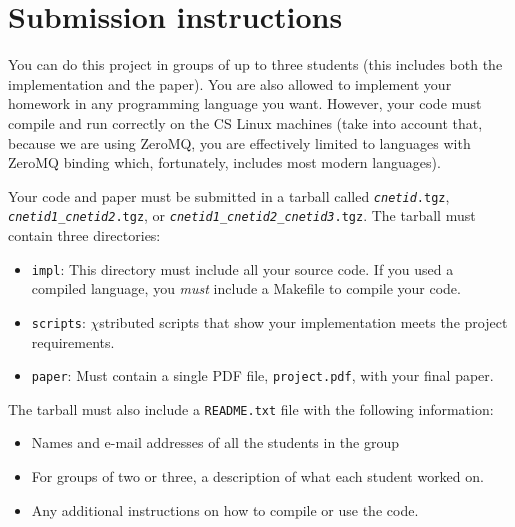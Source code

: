 \documentclass[12pt]{article}
\newcommand{\chistributed}{$\chi$\textsf{stributed} }
\begin{document}
\section{Submission instructions}

You can do this project in groups of up to three students (this includes both the implementation and the paper). You are also allowed to implement your homework in any programming language you want. However, your code must compile and run correctly on the CS Linux machines (take into account that, because we are using ZeroMQ, you are effectively limited to languages with ZeroMQ binding which, fortunately, includes most modern languages). 

Your code and paper must be submitted in a tarball called \texttt{\emph{cnetid}.tgz}, \texttt{\emph{cnetid1}\_\emph{cnetid2}.tgz}, or \texttt{\emph{cnetid1}\_\emph{cnetid2}\_\emph{cnetid3}.tgz}. The tarball must contain three directories:

\begin{itemize}
 \item \texttt{impl}: This directory must include all your source code. If you used a compiled language, you \emph{must} include a Makefile to compile your code.
 \item \texttt{scripts}: \chistributed scripts that show your implementation meets the project requirements.
 \item \texttt{paper}: Must contain a single PDF file, \texttt{project.pdf}, with your final paper.
\end{itemize}

The tarball must also include a \texttt{README.txt} file with the following information:

\begin{itemize}
 \item Names and e-mail addresses of all the students in the group
 \item For groups of two or three, a description of what each student worked on.
 \item Any additional instructions on how to compile or use the code.
\end{itemize}
\end{document}
